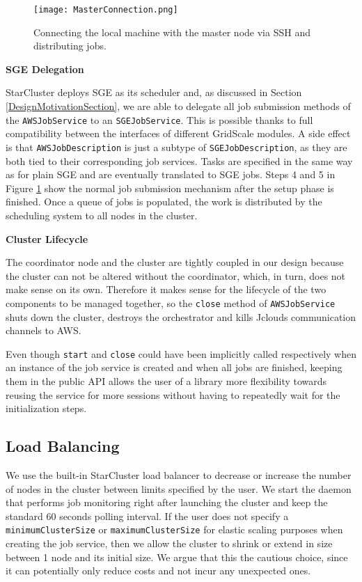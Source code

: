 \begin{figure}[h]
	\centering
		\texttt{[image: MasterConnection.png]}
	\caption{Connecting the local machine with the master node via SSH and distributing jobs.}
	\label{MasterConnection}
\end{figure}

\vspace{2mm}
\textbf{SGE Delegation}
\vspace{1mm}

StarCluster deploys SGE as its scheduler and, as discussed in Section \ref{DesignMotivationSection}, we are able to delegate all job submission methods of the \verb|AWSJobService| to an \verb|SGEJobService|. This is possible thanks to full compatibility between the interfaces of different GridScale modules. A side effect is that \verb|AWSJobDescription| is just a subtype of \verb|SGEJobDescription|, as they are both tied to their corresponding job services. Tasks are specified in the same way as for plain SGE and are eventually translated to SGE jobs. Steps 4 and 5 in Figure \ref{MasterConnection} show the normal job submission mechanism after the setup phase is finished. Once a queue of jobs is populated, the work is distributed by the scheduling system to all nodes in the cluster.

\vspace{1mm}
\textbf{Cluster Lifecycle}

The coordinator node and the cluster are tightly coupled in our design because the cluster can not be altered without the coordinator, which, in turn, does not make sense on its own. Therefore it makes sense for the lifecycle of the two components to be managed together, so the \verb|close| method of \verb|AWSJobService| shuts down the cluster, destroys the orchestrator and kills Jclouds communication channels to AWS.

Even though \verb|start| and \verb|close| could have been implicitly called respectively when an instance of the job service is created and when all jobs are finished, keeping them in the public API allows the user of a library more flexibility towards reusing the service for more sessions without having to repeatedly wait for the initialization steps.

\subsection{Load Balancing}

We use the built-in StarCluster load balancer to decrease or increase the number of nodes in the cluster between limits specified by the user. We start the daemon that performs job monitoring right after launching the cluster and keep the standard 60 seconds polling interval. If the user does not specify a \verb|minimumClusterSize| or \verb|maximumClusterSize| for elastic scaling purposes when creating the job service, then we allow the cluster to shrink or extend in size between 1 node and its initial size. We argue that this the cautious choice, since it can potentially only reduce costs and not incur any unexpected ones.

